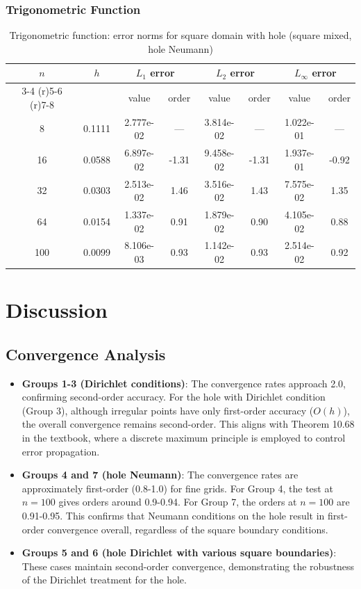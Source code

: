 \documentclass[12pt,a4paper]{article}
\begin{document}
\subsubsection{Trigonometric Function}
\begin{table}[H]
\centering
\caption{Trigonometric function: error norms for square domain with hole (square mixed, hole Neumann)}
\begin{tabular}{cccccccc}
\toprule
$n$ & $h$ & \multicolumn{2}{c}{$L_1$ error} & \multicolumn{2}{c}{$L_2$ error} & \multicolumn{2}{c}{$L_\infty$ error} \\
\cmidrule(r){3-4} \cmidrule(r){5-6} \cmidrule(r){7-8}
& & value & order & value & order & value & order \\
\midrule
8  & 0.1111 & 2.777e-02 & --- & 3.814e-02 & --- & 1.022e-01 & --- \\
16 & 0.0588 & 6.897e-02 & -1.31 & 9.458e-02 & -1.31 & 1.937e-01 & -0.92 \\
32 & 0.0303 & 2.513e-02 & 1.46 & 3.516e-02 & 1.43 & 7.575e-02 & 1.35 \\
64 & 0.0154 & 1.337e-02 & 0.91 & 1.879e-02 & 0.90 & 4.105e-02 & 0.88 \\
100 & 0.0099 & 8.106e-03 & 0.93 & 1.142e-02 & 0.93 & 2.514e-02 & 0.92 \\
\bottomrule
\end{tabular}
\end{table}

\section{Discussion}

\subsection{Convergence Analysis}

\begin{itemize}
    \item \textbf{Groups 1-3 (Dirichlet conditions)}: The convergence rates approach 2.0, confirming second-order accuracy. For the hole with Dirichlet condition (Group 3), although irregular points have only first-order accuracy (\(O(h)\)), the overall convergence remains second-order. This aligns with Theorem 10.68 in the textbook, where a discrete maximum principle is employed to control error propagation.
    
    \item \textbf{Groups 4 and 7 (hole Neumann)}: The convergence rates are approximately first-order (0.8-1.0) for fine grids. For Group 4, the test at \(n=100\) gives orders around 0.9-0.94. For Group 7, the orders at \(n=100\) are 0.91-0.95. This confirms that Neumann conditions on the hole result in first-order convergence overall, regardless of the square boundary conditions.
    
    \item \textbf{Groups 5 and 6 (hole Dirichlet with various square boundaries)}: These cases maintain second-order convergence, demonstrating the robustness of the Dirichlet treatment for the hole.
\end{itemize}
\end{document}
